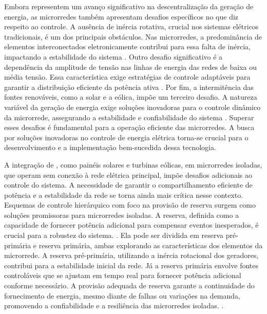 Embora representem um avanço significativo na descentralização da geração de energia, as microrredes também apresentam desafios específicos no que diz respeito ao controle. A ausência de inércia rotativa, crucial nos sistemas elétricos tradicionais, é um dos principais obstáculos. Nas microrredes, a predominância de elementos interconectados eletronicamente contribui para essa falta de inércia, impactando a estabilidade do sistema \citep{Paigi2013}. Outro desafio significativo é a dependência da amplitude de tensão nas linhas de energia das redes de baixa ou média tensão. Essa característica exige estratégias de controle adaptáveis para garantir a distribuição eficiente da potência ativa \citep{Paigi2013}. Por fim, a intermitência das fontes renováveis, como a solar e a eólica, impõe um terceiro desafio. A natureza variável da geração de energia exige soluções inovadoras para o controle dinâmico da microrrede, assegurando a estabilidade e confiabilidade do sistema \citep{Paigi2013}. Superar esses desafios é fundamental para a operação eficiente das microrredes. A busca por soluções inovadoras no controle de energia elétrica torna-se crucial para o desenvolvimento e a implementação bem-sucedida dessa tecnologia.

A integração de , como painéis solares e turbinas eólicas, em microrredes isoladas, que operam sem conexão à rede elétrica principal, impõe desafios adicionais ao controle do sistema. A necessidade de garantir o compartilhamento eficiente de potência e a estabilidade da rede se torna ainda mais crítica nesse contexto. Esquemas de controle hierárquico com foco na provisão de reserva surgem como soluções promissoras para microrredes isoladas. A reserva, definida como a capacidade de fornecer potência adicional para compensar eventos inesperados, é crucial para a robustez do sistema.  \citep{Paigi2013}. Ela pode ser dividida em reserva pré-primária e reserva primária, ambas explorando as características dos elementos da microrrede. A reserva pré-primária, utilizando a inércia rotacional dos geradores, contribui para a estabilidade inicial da rede. Já a reserva primária envolve fontes controláveis que se ajustam em tempo real para fornecer potência adicional conforme necessário. A provisão adequada de reserva garante a continuidade do fornecimento de energia, mesmo diante de falhas ou variações na demanda, promovendo a confiabilidade e a resiliência das microrredes isoladas. \citep{Paigi2013}.

